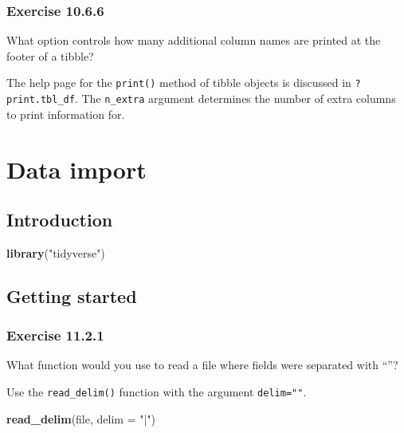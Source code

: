 \documentclass[]{book}
\newenvironment{Shaded}{\begin{snugshade}}{\end{snugshade}}
\newcommand{\DataTypeTok}[1]{\textcolor[rgb]{0.13,0.29,0.53}{#1}}
\newcommand{\KeywordTok}[1]{\textcolor[rgb]{0.13,0.29,0.53}{\textbf{#1}}}
\newcommand{\NormalTok}[1]{#1}
\newcommand{\StringTok}[1]{\textcolor[rgb]{0.31,0.60,0.02}{#1}}
\theoremstyle{plain}
\theoremstyle{remark}
\theoremstyle{definition}
\theoremstyle{definition}
\theoremstyle{definition}
\theoremstyle{remark}
\begin{document}
\hypertarget{exercise-10.6.6}{%
\subsection*{\texorpdfstring{Exercise
{10.6.6}}{Exercise 10.6.6}}\label{exercise-10.6.6}}

What option controls how many additional column names are printed at the
footer of a tibble?

The help page for the \texttt{print()} method of tibble objects is
discussed in \texttt{?print.tbl\_df}. The \texttt{n\_extra} argument
determines the number of extra columns to print information for.

\hypertarget{data-import}{%
\chapter{Data import}\label{data-import}}

\hypertarget{introduction-6}{%
\section{Introduction}\label{introduction-6}}

\begin{Shaded}
\begin{Highlighting}[]
\KeywordTok{library}\NormalTok{(}\StringTok{"tidyverse"}\NormalTok{)}
\end{Highlighting}
\end{Shaded}

\hypertarget{getting-started}{%
\section{Getting started}\label{getting-started}}

\hypertarget{exercise-11.2.1}{%
\subsection*{\texorpdfstring{Exercise
{11.2.1}}{Exercise 11.2.1}}\label{exercise-11.2.1}}

What function would you use to read a file where fields were separated
with ``\textbar{}''?

Use the \texttt{read\_delim()} function with the argument
\texttt{delim="\textbar{}"}.

\begin{Shaded}
\begin{Highlighting}[]
\KeywordTok{read_delim}\NormalTok{(file, }\DataTypeTok{delim =} \StringTok{"|"}\NormalTok{)}
\end{Highlighting}
\end{Shaded}
\end{document}
